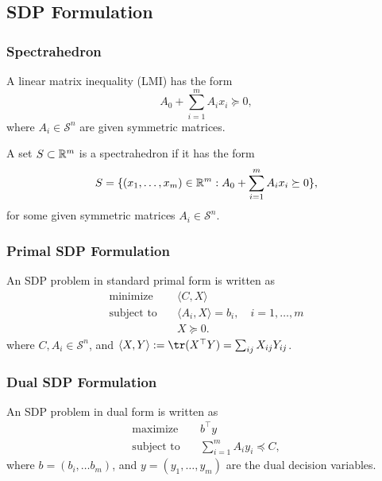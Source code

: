 \documentclass[12pt]{article}
\begin{document}
\subsection{SDP Formulation}
\subsubsection{Spectrahedron}

\begin{Define}[LMI]
  A linear matrix inequality (LMI) has the
  form
  \[
    A_0 + \sum_{i=1}^m A_ix_i \succeq 0,
  \]
  where $A_i \in \mathcal{S}^n$ are given
  symmetric matrices.
\end{Define}

\begin{Define}[Spectrahedron]
  A set $S \subset \mathbb{R}^m$ is a spectrahedron if
  it has the form
  \[
    S = \{(x_1,\dots,x_m) \in \mathbb{R}^m :
    A_0 + \sum_{i=1}^m A_ix_i \succeq 0\},
  \]
  for some given symmetric matrices $A_i \in
  \mathcal{S}^n$.
\end{Define}

\subsubsection{Primal SDP Formulation}
\begin{Define}
  \normalfont
  An SDP problem in standard primal form is written as
  \begin{align*}
    \text{minimize} \quad & \langle C,X \rangle \\
    \text{subject to} \quad &\langle A_i, X \rangle =b_i,
                              \quad i = 1, \dots, m\\
                          & X \succeq 0.
  \end{align*}
  where $C, A_i \in \mathcal{S}^n$, and $\langle X,Y
  \rangle := \tr(X^\top Y) = \sum_{ij}X_{ij}Y_{ij}$.

\end{Define}

\subsubsection{Dual SDP Formulation}
\begin{Define}
  \normalfont
  An SDP problem in dual form is written as
  \begin{align*}
    \text{maximize} \quad & b^\top y \\
    \text{subject to} \quad & \sum_{i=1}^m A_iy_i
                              \preceq C,
  \end{align*}
  where $b = (b_i,\dots b_m)$, and $y = (y_1,\dots, y_m)$
  are the dual decision variables.
\end{Define}
\end{document}
